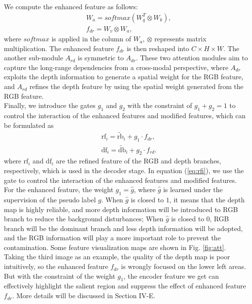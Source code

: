 \documentclass[journal]{IEEEtran}
\begin{document}
We compute the enhanced feature as follows:
\begin{align}
& W_a = softmax(W_q^T \otimes W_k), \\
& f_{dr} = W_v \otimes W_a,
\end{align}
where $softmax$ is applied in the column of $W_a$, $\otimes$ represents matrix multiplication.
The enhanced feature $f_{dr}$ is then reshaped into $C\times H\times W$.
The another sub-module $A_{rd}$ is symmetric to $A_{dr}$.
These two attention modules aim to capture the long-range dependencies from a cross-modal perspective, where $A_{dr}$ exploits the depth information to generate a spatial weight for the RGB feature, and $A_{rd}$ refines the depth feature by using the spatial weight generated from the RGB feature.
\\
\indent Finally, we introduce the gates $g_1$ and $g_2$ with the constraint of $g_1+g_2=1$ to control the interaction of the enhanced features and modified features, which can be formulated as
\begin{align}
&\mathrm{rf}_i = \tilde{\mathrm{rb}}_i + g_1 \cdot f_{dr}, \label{eq:rfi} \\
&\mathrm{df}_i = \tilde{\mathrm{db}}_i + g_2 \cdot f_{rd}.
\end{align}
where $\mathrm{rf}_i$ and $\mathrm{df}_i$ are the refined feature of the RGB and depth branches, respectively, which is used in the decoder stage.
In equation (\ref{eq:rfi}), we use the gate to control the interaction of the enhanced features and modified features. For the enhanced feature, the weight $g_1=\hat{g}$, where $\hat{g}$ is learned under the supervision of the pseudo label $g$. When $\hat{g}$ is closed to $1$, it means that the depth map is highly reliable, and more depth information will be introduced to RGB branch to reduce the background disturbances; When $\hat{g}$ is closed to 0, RGB branch will be the dominant branch and less depth information will be adopted, and the RGB information will play a more important role to prevent the contamination. Some feature visualization maps are shown in Fig. \ref{fig:att}. Taking the third image as an example, the quality of the depth map is poor intuitively, so the enhanced feature $f_{dr}$ is wrongly focused on the lower left areas. But with the constraint of the weight $g_1$, the encoder feature we get can effectively highlight the salient region and suppress the effect of enhanced feature $f_{dr}$. More details will be discussed in Section IV-E.
\end{document}
